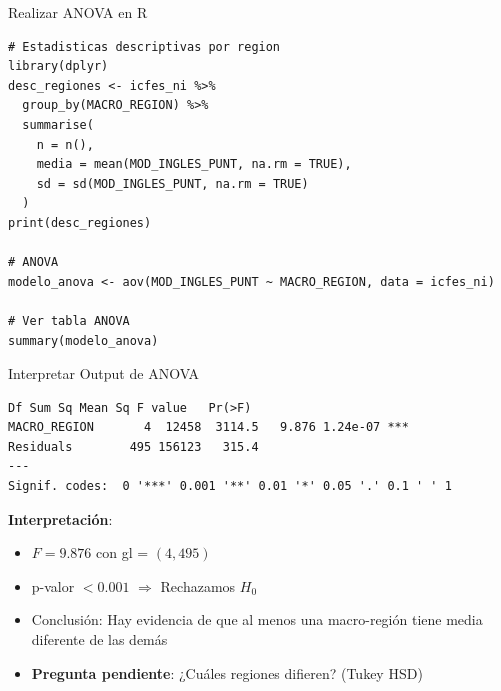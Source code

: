 \documentclass[aspectratio=169, 11pt]{beamer}
\begin{document}
\begin{frame}[fragile]{Realizar ANOVA en R}
\begin{lstlisting}
# Estadisticas descriptivas por region
library(dplyr)
desc_regiones <- icfes_ni %>%
  group_by(MACRO_REGION) %>%
  summarise(
    n = n(),
    media = mean(MOD_INGLES_PUNT, na.rm = TRUE),
    sd = sd(MOD_INGLES_PUNT, na.rm = TRUE)
  )
print(desc_regiones)

# ANOVA
modelo_anova <- aov(MOD_INGLES_PUNT ~ MACRO_REGION, data = icfes_ni)

# Ver tabla ANOVA
summary(modelo_anova)
\end{lstlisting}
\end{frame}

\begin{frame}[fragile]{Interpretar Output de ANOVA}
\begin{lstlisting}[basicstyle=\ttfamily\footnotesize]
                  Df Sum Sq Mean Sq F value   Pr(>F)
MACRO_REGION       4  12458  3114.5   9.876 1.24e-07 ***
Residuals        495 156123   315.4
---
Signif. codes:  0 '***' 0.001 '**' 0.01 '*' 0.05 '.' 0.1 ' ' 1
\end{lstlisting}

\vspace{0.3cm}
\textbf{Interpretación}:
\begin{itemize}
  \item $F = 9.876$ con gl = $(4, 495)$
  \item p-valor $< 0.001$ $\Rightarrow$ \alert{Rechazamos $H_0$}
  \item Conclusión: Hay evidencia de que al menos una macro-región tiene media diferente de las demás
  \item \textbf{Pregunta pendiente}: ¿Cuáles regiones difieren? (Tukey HSD)
\end{itemize}
\end{frame}
\end{document}
